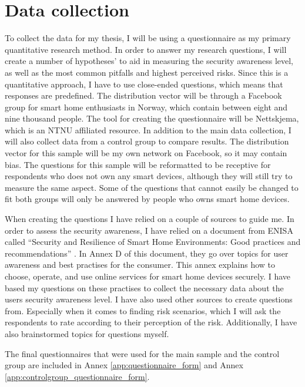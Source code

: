\section{Data collection}
To collect the data for my thesis, I will be using a questionnaire as my primary quantitative research method. 
In order to answer my research questions, I will create a number of hypotheses' to aid in measuring the security awareness level, as well as the most common pitfalls and highest perceived risks. Since this is a quantitative approach, I have to use close-ended questions, which means that responses are predefined. The distribution vector will be through a Facebook group for smart home enthusiasts in Norway, which contain between eight and nine thousand people. The tool for creating the questionnaire will be Nettskjema, which is an NTNU affiliated resource. In addition to the main data collection, I will also collect data from a control group to compare results. The distribution vector for this sample will be my own network on Facebook, so it may contain bias. The questions for this sample will be reformatted to be receptive for respondents who does not own any smart devices, although they will still try to measure the same aspect. Some of the questions that cannot easily be changed to fit both groups will only be answered by people who owns smart home devices. 

When creating the questions I have relied on a couple of sources to guide me. In order to assess the security awareness, I have relied on a document from ENISA called ``Security and Resilience of Smart Home Environments: Good practices and recommendations'' \cite{ENISA2015SmartHome}. In Annex D of this document, they go over topics for user awareness and best practises for the consumer. This annex explains how to choose, operate, and use online services for smart home devices securely. I have based my questions on these practises to collect the necessary data about the users security awareness level. I have also used other sources \cite{Awad2018} \cite{Caviglione2015} \cite{Schaik2017} to create questions from. Especially when it comes to finding risk scenarios, which I will ask the respondents to rate according to their perception of the risk. Additionally, I have also brainstormed topics for questions myself. 

The final questionnaires that were used for the main sample and the control group are included in Annex \ref{app:questionnaire_form} and Annex \ref{app:controlgroup_questionnaire_form}. 

